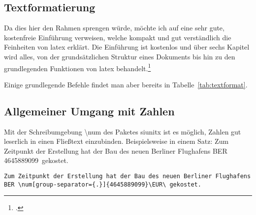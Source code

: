 \subsection{Textformatierung}%
\label{sec:textformat}
Da dies hier den Rahmen sprengen würde, möchte ich auf eine sehr gute, kostenfreie Einführung verweisen, welche kompakt und gut verständlich die Feinheiten von \gls{latex} erklärt. Die Einführung ist kostenlos und über sechs Kapitel wird alles, von der grundsätzlichen Struktur eines Dokuments bis hin zu den grundlegenden Funktionen von \gls{latex} behandelt.\footcite{oetiker_not_2018}

\begin{table}[htbp]
  \caption{Grundlegende Textformatierung}
  \label{tab:textformat}
\end{table}

Einige grundlegende Befehle findet man aber bereits in Tabelle~\ref{tab:textformat}.
\subsection{Allgemeiner Umgang mit Zahlen}%
\label{sec:allgzahl}
Mit der Schreibumgebung \textbackslash num des Paketes siunitx ist es möglich, Zahlen gut leserlich in einen Fließtext einzubinden. Beispielsweise in einem Satz: Zum Zeitpunkt der Erstellung hat der Bau des neuen Berliner Flughafens BER \num[group-separator={.}]{4645889099}\EUR\ gekostet.
\begin{lstlisting}[float=htb,caption=Darstellung von Zahlen in \protect\LaTeX{},label=lst:zahlen]
Zum Zeitpunkt der Erstellung hat der Bau des neuen Berliner Flughafens BER \num[group-separator={.}]{4645889099}\EUR\ gekostet.
\end{lstlisting}


